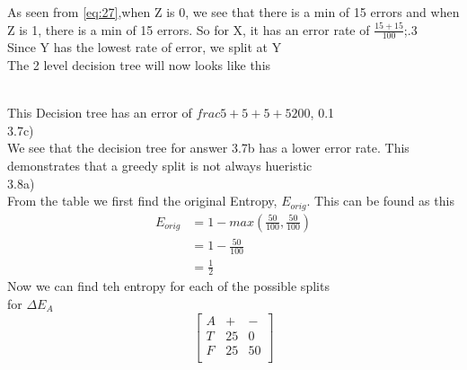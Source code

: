 \documentclass[12pt,english]{article}
\begin{document}
As seen from \eqref{eq:27},when Z is 0, we see that there is a min of 15 errors and when Z is 1, there is a min of 15 errors. So for X, it has an error rate of $\frac{15+15}{100}$;.3\\
Since Y has the lowest rate of error, we split at Y\\
The 2 level decision tree will now looks like this\\
\\
This Decision tree has an error of $frac{5+5+5+5}{200}$, 0.1\\
3.7c)\\
We see that the decision tree for answer 3.7b has a lower error rate. This demonstrates that a greedy split is not always hueristic\\
3.8a)\\
From the table we first find the original Entropy, $E_{orig}$. This can be found as this\\
\begin{equation*}\tag{1}\label{eq:28}
\begin{split}
E_{orig} &= 1 - max(\frac{50}{100},\frac{50}{100})\\
&=1 - \frac{50}{100}\\
&=\frac{1}{2}
\end{split}
\end{equation*}
Now we can find teh entropy for each of the possible splits\\
for $\Delta E_{A}$\\
\begin{equation*}\tag{2}\label{eq:29}
\begin{bmatrix} A & + & - \\T & 25 &  0 \\F & 25 & 50 \\ \end{bmatrix}
\end{equation*}
\end{document}

